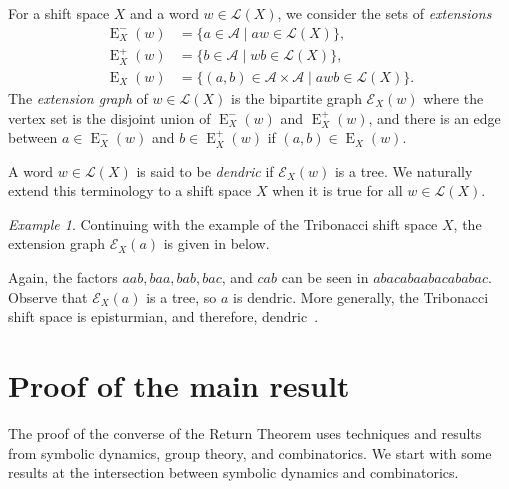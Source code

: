 \documentclass{amsart}
\newcommand*{\lang}{\mathcal{L}}
\newcommand*{\cA}{\mathcal{A}}
\newcommand*{\Ext}{\operatorname{E}}
\newcommand*{\LExt}{\operatorname{E}^-}
\newcommand*{\RExt}{\operatorname{E}^+}
\newcommand*{\ExtGraph}{\mathcal{E}}
\theoremstyle{plain}
\theoremstyle{definition}
\theoremstyle{remark}
\newtheorem{example}[theorem]{Example}
\begin{document}
For a shift space $X$ and a word $w\in\lang(X)$, we consider the sets of {\em extensions}
\begin{align*}
    \LExt_X(w) &= \{ a\in \cA \mid aw\in \lang(X) \},\\
    \RExt_X(w) &= \{ b\in \cA \mid wb\in \lang(X) \},\\ 
    \Ext_X(w) &= \{(a,b) \in \cA\times \cA \mid awb\in \lang(X)\}.
\end{align*}
The \emph{extension graph} of $w\in \lang(X)$ is the bipartite graph $\ExtGraph_X(w)$ where the vertex set is the disjoint union of $\LExt_X(w)$ and $\RExt_X(w)$, and there is an edge between $a\in\LExt_X(w)$ and $b\in\RExt_X(w)$ if $(a,b)\in \Ext_X(w)$.

A word $w\in\lang(X)$ is said to be \emph{dendric} if $\ExtGraph_X(w)$ is a tree. We naturally extend this terminology to a shift space $X$ when it is true for all $w \in \lang(X)$. 

\begin{example}
Continuing with the example of the Tribonacci shift space $X$, the extension graph $\ExtGraph_X(a)$ is given in below.
\begin{center}
\end{center}
Again, the factors $aab, baa,bab,bac$, and $cab$ can be seen in $abacabaabacababac$. Observe that $\ExtGraph_X(a)$ is a tree, so $a$ is dendric. More generally, the Tribonacci shift space is episturmian, and therefore, dendric~\cite{Berthe2015}.
\end{example}

\section{Proof of the main result}
\label{s:main}

The proof of the converse of the Return Theorem uses techniques and results from symbolic dynamics, group theory, and combinatorics. We start with some results at the intersection between symbolic dynamics and combinatorics.
\end{document}
